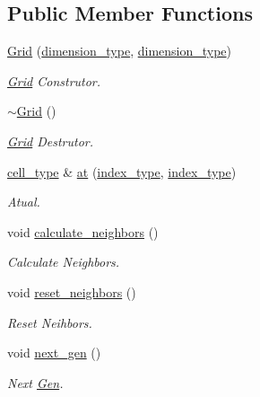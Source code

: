 \subsection*{Public Member Functions}
\begin{DoxyCompactItemize}
\item 
\hyperlink{classlg_1_1Grid_aec8c088d4c9516fa428a056d3bf84596}{Grid} (\hyperlink{classlg_1_1Grid_a11f5474e622f3053e006acf549c41f10}{dimension\+\_\+type}, \hyperlink{classlg_1_1Grid_a11f5474e622f3053e006acf549c41f10}{dimension\+\_\+type})
\begin{DoxyCompactList}\small\item\em \hyperlink{classlg_1_1Grid}{Grid} Construtor. \end{DoxyCompactList}\item 
\hyperlink{classlg_1_1Grid_ada687dd6ced8db79f42f615b68a20d07}{$\sim$\+Grid} ()
\begin{DoxyCompactList}\small\item\em \hyperlink{classlg_1_1Grid}{Grid} Destrutor. \end{DoxyCompactList}\item 
\hyperlink{classlg_1_1Grid_a87cd073ad5dc312152c4c94b5343c709}{cell\+\_\+type} \& \hyperlink{classlg_1_1Grid_a9025d70d81f668f805b03181b3850924}{at} (\hyperlink{classlg_1_1Grid_a3273db5925a31839b6450849af301e45}{index\+\_\+type}, \hyperlink{classlg_1_1Grid_a3273db5925a31839b6450849af301e45}{index\+\_\+type})
\begin{DoxyCompactList}\small\item\em Atual. \end{DoxyCompactList}\item 
void \hyperlink{classlg_1_1Grid_ad4f56f6abd2402aebd28f9a4b5bce983}{calculate\+\_\+neighbors} ()
\begin{DoxyCompactList}\small\item\em Calculate Neighbors. \end{DoxyCompactList}\item 
void \hyperlink{classlg_1_1Grid_a5023d113d6acda5db7631010c1480e69}{reset\+\_\+neighbors} ()
\begin{DoxyCompactList}\small\item\em Reset Neihbors. \end{DoxyCompactList}\item 
void \hyperlink{classlg_1_1Grid_afc1883ddfc34fcb7a47cf7494bb6b6ed}{next\+\_\+gen} ()
\begin{DoxyCompactList}\small\item\em Next \hyperlink{classlg_1_1Gen}{Gen}. \end{DoxyCompactList}\end{DoxyCompactItemize}


